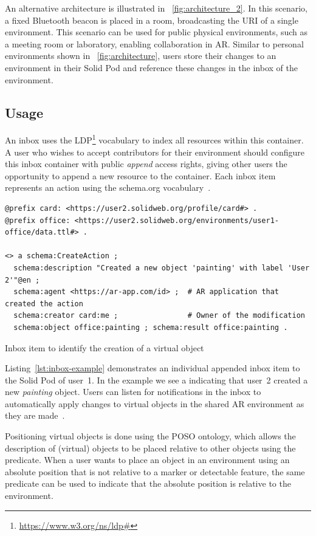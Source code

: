 An alternative architecture is illustrated in \figurename~\ref{fig:architecture_2}. In this scenario, a fixed Bluetooth beacon is placed in a room, broadcasting the URI of a single environment. This scenario can be used for public physical environments, such as a meeting room or laboratory, enabling collaboration in AR. Similar to personal environments shown in \figurename~\ref{fig:architecture}, users store their changes to an environment in their Solid Pod and reference these changes in the inbox of the environment.

\subsection{Usage}
An inbox uses the LDP\footnote{\url{https://www.w3.org/ns/ldp\#}} vocabulary to index all resources within this container. A user who wishes to accept contributors for their environment should configure this inbox container with public \textit{append} access rights, giving other users the opportunity to append a new resource to the container. Each inbox item represents an action using the \mbox{schema.org} vocabulary~\cite{10.1002/asi.24744}.

\begin{listing}[htb]
\begin{verbatim}
@prefix card: <https://user2.solidweb.org/profile/card#> .
@prefix office: <https://user2.solidweb.org/environments/user1-office/data.ttl#> .

<> a schema:CreateAction ;
  schema:description "Created a new object 'painting' with label 'User 2'"@en ;
  schema:agent <https://ar-app.com/id> ;  # AR application that created the action
  schema:creator card:me ;                # Owner of the modification
  schema:object office:painting ; schema:result office:painting .
\end{verbatim}
\caption{Inbox item to identify the creation of a virtual object} \label{lst:inbox-example}
\end{listing}

Listing~\ref{lst:inbox-example} demonstrates an individual appended inbox item to the Solid Pod of user~1. In the example we see a  indicating that user~2 created a new \textit{painting} object. Users can listen for notifications in the inbox to automatically apply changes to virtual objects in the shared AR environment as they are made~\cite{10.1007/978-3-319-58068-5_33}.

Positioning virtual objects is done using the POSO ontology, which allows the description of (virtual) objects to be placed relative to other objects using the  predicate. When a user wants to place an object in an environment using an absolute position that is not relative to a marker or detectable feature, the same predicate can be used to indicate that the absolute position is relative to the environment.

